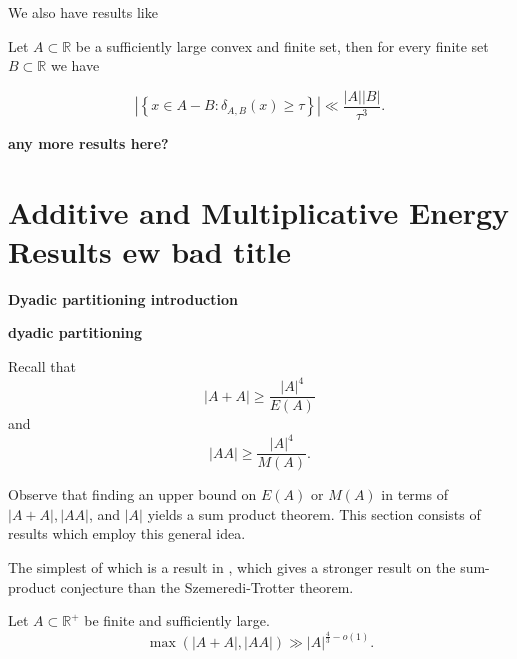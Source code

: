 \documentclass[12pt]{amsart}
\begin{document}
We also have results like

\begin{theorem}

    Let \(A \subset \mathbb{R} \) be a sufficiently large convex and finite set, then for every 
    finite set \(B \subset \mathbb{R} \) we have

    \[
        \left\lvert \left\{ x \in A-B : \delta_{A,B} (x) \geq \tau \right\}  \right\rvert \ll \frac{\left\lvert A \right\rvert \left\lvert B \right\rvert }{\tau^{3} }
    .\]
\end{theorem}

\textbf{any more results here?}

\section{Additive and Multiplicative Energy Results \textbf{ew bad title} }

\textbf{Dyadic partitioning introduction}

\begin{lemma}
\textbf{dyadic partitioning}
\end{lemma}

Recall that
\[
    \left\lvert A + A \right\rvert \geq  \frac{\left\lvert A \right\rvert ^{4}}{ E(A) }
\]
and
\[
    \left\lvert AA \right\rvert \geq \frac{\left\lvert A \right\rvert ^{4}}{M(A) }
.\]

Observe that finding an upper bound on \(E(A)\) or \(M(A)\) in terms of \(\left\lvert A + A \right\rvert, \left\lvert AA \right\rvert    \), and \(\left\lvert A \right\rvert \)
yields a sum product theorem. This section consists of results which employ this general idea.

The simplest of which is a result in \cite{Solymosi}, which gives a stronger result
on the sum-product conjecture than the Szemeredi-Trotter theorem. 

\begin{theorem}
Let \(A \subset \mathbb{R}^{+} \) be finite and sufficiently large.
\[
    \max \left( \left\lvert A+A \right\rvert , \left\lvert AA \right\rvert  \right) \gg \left\lvert A \right\rvert ^{\frac{4}{3} - o(1)}
.\]
\end{theorem}
\end{document}
